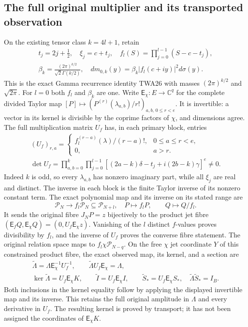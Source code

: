 \documentclass[11pt,a4paper]{article}
\begin{document}
\subsection{The full original multiplier and its transported observation}
On the existing tensor class $k=4l+1$, retain
\[
\begin{gathered}
 t_j=2j+\tfrac12,\quad\xi_j=c+t_j,\quad
 f_l(S)=\prod_{j=0}^{l-1}(S-c-t_j),\\
 \beta_k=\frac{(2\pi)^{k/2}}{\sqrt2\Gamma(k/2)},\quad
 dm_{0,k}(y)=\beta_k|f_l(c+iy)|^2d\sigma(y).
\end{gathered}\tag{AMT23}
\]
This is the exact Gamma recurrence identity TWA26 with masses
$(2\pi)^{k/2}$ and $\sqrt{2\pi}$. For $l=0$ both $f_l$ and
$\beta_k$ are one. Write $\mathsf E_\chi:E\to\mathbb C^q$ for
the complete divided Taylor map
$[P]\mapsto(P^{(r)}(\lambda_{a,b})/r!)_{a,b,\,0\le r<e}$.
It is invertible: a vector in its kernel is divisible by the
coprime factors of $\chi$, and dimensions agree. The full
multiplication matrix $U_f$ has, in each primary block, entries
\[
\begin{gathered}
 (U_f)_{r,a}=\begin{cases}
 f_l^{(r-a)}(\lambda)/(r-a)!,&0\le a\le r<e,\\
 0,&a>r.
 \end{cases}\\
 \det U_f=\prod_{a,b=0}^k\prod_{j=0}^{l-1}
       [(2a-k)\delta-t_j+i(2b-k)\gamma]^e\ne0.
\end{gathered}\tag{AMT24}
\]
Indeed $k$ is odd, so every $\lambda_{a,b}$ has nonzero imaginary
part, while all $\xi_j$ are real and distinct. The inverse in each
block is the finite Taylor inverse of its nonzero constant term.
The exact polynomial map and its inverse on its stated range are
\[
 \mathcal P_N\longrightarrow f_l\mathcal P_N\subseteq\mathcal P_{N+l},
 \quad P\longmapsto f_lP,
 \qquad Q\longmapsto Q/f_l.
 \tag{AMT25}
\]
It sends the original fibre $J_NP=z$ bijectively to the product
jet fibre $(\mathsf E_fQ,\mathsf E_\chi Q)=(0,U_f\mathsf E_\chi z)$.
Vanishing of the $l$ distinct $f$-values proves divisibility by
$f_l$, and the inverse of $U_f$ proves the converse fibre statement.
The original relation space maps to $f_l\chi\mathcal P_{N-q}$.
On the free $\chi$ jet coordinate $Y$ of this constrained product
fibre, the exact observed map, its kernel, and a section are
\[
\boxed{\begin{gathered}
 \widetilde\Lambda=\Lambda\mathsf E_\chi^{-1}U_f^{-1},\qquad
 \widetilde\Lambda U_f\mathsf E_\chi=\Lambda,\\
 \ker\widetilde\Lambda=U_f\mathsf E_\chi K,\qquad
 \widetilde I=U_f\mathsf E_\chi I,\qquad
 \widetilde S_*=U_f\mathsf E_\chi S_*,\quad
 \widetilde\Lambda\widetilde S_*=I_B.
\end{gathered}}\tag{AMT26}
\]
Both inclusions in the kernel equality follow by applying the
displayed invertible map and its inverse. This retains the full
original amplitude in $\Lambda$ and every derivative in $U_f$.
The resulting kernel is proved by transport; it has not been
assigned the coordinates of $\mathsf E_\chi K$.
\end{document}
